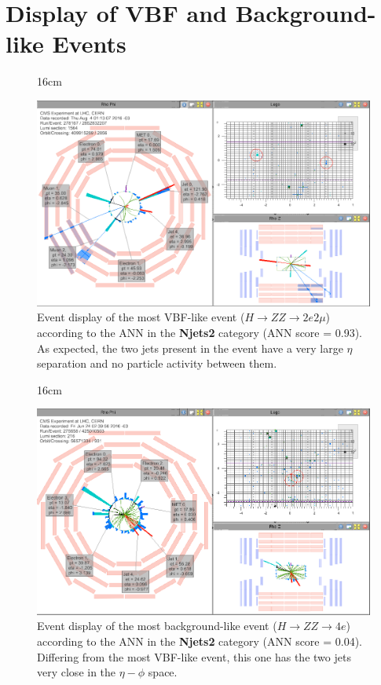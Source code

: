 \chapter{Display of VBF and Background-like Events}
 
\begin{figure}[H!]{16cm}
	\vspace{-20cm}
	\caption{Event display of the most VBF-like event ($H \rightarrow ZZ \rightarrow 2e2\mu$) according to the ANN in the \textbf{Njets2} category (ANN score = 0.93). As expected, the two jets present in the event have a very large $\eta$ separation and no particle activity between them.}
	\includegraphics[scale=0.7,angle=90]{ChapterAnalysis/figs/event_display_Run278167_Lumi1564_Event2852832207_Njets2_ANN0p93_DoubleEG_Run2016F_2}
\end{figure}

\begin{figure}[H!]{16cm}
	\caption{Event display of the most background-like event ($H \rightarrow ZZ \rightarrow 4e$) according to the ANN in the \textbf{Njets2} category (ANN score = 0.04). Differing from the most VBF-like event, this one has the two jets very close in the $\eta-\phi$ space.}
	\includegraphics[scale=0.7,angle=90]{ChapterAnalysis/figs/event_display_Run275658_Lumi216_Event425010503_Njets2_ANN0p15_DoubleEG_Run2016C_2}
\end{figure}

